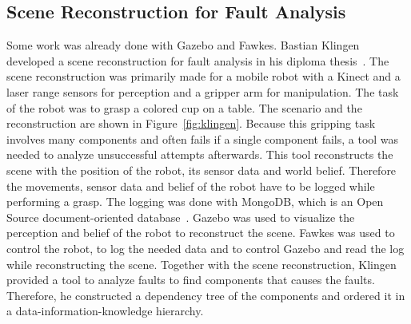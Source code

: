 \subsection{Scene Reconstruction for Fault Analysis}
Some work was already done with Gazebo and Fawkes. Bastian Klingen developed a scene reconstruction for fault analysis in his diploma thesis~\cite{KlingenDA}. The scene reconstruction was primarily made for a mobile robot with a Kinect and a laser range sensors for perception and a gripper arm for manipulation. The task of the robot was to grasp a colored cup on a table. The scenario and the reconstruction are shown in Figure~\ref{fig:klingen}. Because this gripping task involves many components and often fails if a single component fails, a tool was needed to analyze unsuccessful attempts afterwards. This tool reconstructs the scene with the position of the robot, its sensor data and world belief. Therefore the movements, sensor data and belief of the robot have to be logged while performing a grasp. The logging was done with MongoDB, which is an Open Source document-oriented database~\cite{mongodb}. Gazebo was used to visualize the perception and belief of the robot to reconstruct the scene. Fawkes was used to control the robot, to log the needed data and to control Gazebo and read the log while reconstructing the scene. Together with the scene reconstruction, Klingen provided a tool to analyze faults to find components that causes the faults. Therefore, he constructed a dependency tree of the components and ordered it in a data-information-knowledge hierarchy.\\
